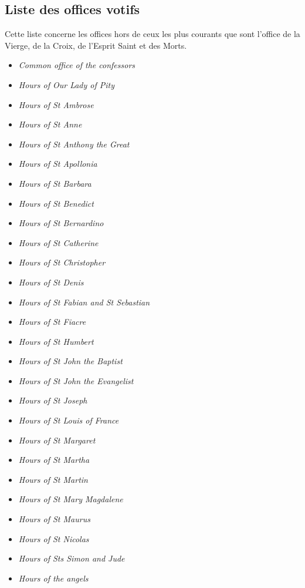 \documentclass[a4paper,12pt,twoside]{book}
\begin{document}
	\subsection{Liste des offices votifs}
	
	Cette liste concerne les offices hors de ceux les plus courants que sont l'office de la Vierge, de la Croix, de l'Esprit Saint et des Morts. 
	
	\begin{multicols}{2}
	\begin{itemize}
\item \textit{Common office of the confessors}
\item \textit{Hours of Our Lady of Pity}
\item \textit{Hours of St Ambrose}
\item \textit{Hours of St Anne}
\item \textit{Hours of St Anthony the Great}
\item \textit{Hours of St Apollonia}
\item \textit{Hours of St Barbara}
\item \textit{Hours of St Benedict}
\item \textit{Hours of St Bernardino}
\item \textit{Hours of St Catherine}
\item \textit{Hours of St Christopher}
\item \textit{Hours of St Denis}
\item \textit{Hours of St Fabian and St Sebastian}
\item \textit{Hours of St Fiacre}
\item \textit{Hours of St Humbert}
\item \textit{Hours of St John the Baptist}
\item \textit{Hours of St John the Evangelist}
\item \textit{Hours of St Joseph}
\item \textit{Hours of St Louis of France}
\item \textit{Hours of St Margaret}
\item \textit{Hours of St Martha}
\item \textit{Hours of St Martin}
\item \textit{Hours of St Mary Magdalene}
\item \textit{Hours of St Maurus}
\item \textit{Hours of St Nicolas}
\item \textit{Hours of Sts Simon and Jude}
\item \textit{Hours of the angels}

\end{itemize}
\end{multicols}
\end{document}
